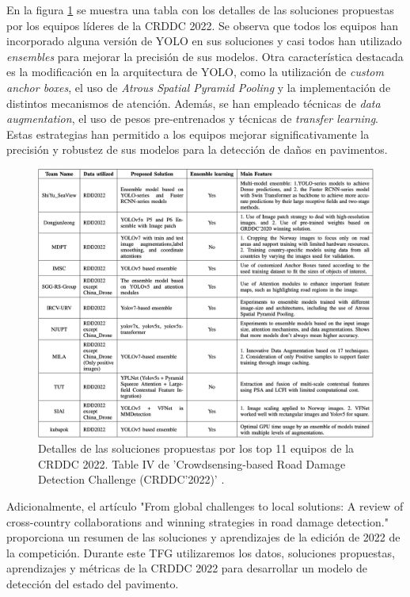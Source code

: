 En la figura \ref{fig:CRDDC2022_detailed_solutions} se muestra una tabla con los detalles de las soluciones propuestas por los equipos líderes de la CRDDC 2022. Se observa que todos los equipos han incorporado alguna versión de YOLO en sus soluciones y casi todos han utilizado \textit{ensembles} para mejorar la precisión de sus modelos. Otra característica destacada es la modificación en la arquitectura de YOLO, como la utilización de \textit{custom anchor boxes}, el uso de \textit{Atrous Spatial Pyramid Pooling} y la implementación de distintos mecanismos de atención. Además, se han empleado técnicas de \textit{data augmentation}, el uso de pesos pre-entrenados y técnicas de \textit{transfer learning}. Estas estrategias han permitido a los equipos mejorar significativamente la precisión y robustez de sus modelos para la detección de daños en pavimentos.

\begin{figure}[H]
    \centering
    \includegraphics[width=1\textwidth]{../img/winner-solutions.png}
    \caption{Detalles de las soluciones propuestas por los top 11 equipos de la CRDDC 2022. Table IV de 'Crowdsensing-based Road Damage Detection Challenge (CRDDC’2022)' \cite{CRDDC2022_paper}.}
    \label{fig:CRDDC2022_detailed_solutions}
\end{figure}

Adicionalmente, el artículo "From global challenges to local solutions: A review of cross-country collaborations and winning strategies in road damage detection." \cite{CRDDC2022_review} proporciona un resumen de las soluciones y aprendizajes de la edición de 2022 de la competición. Durante este TFG utilizaremos los datos, soluciones propuestas, aprendizajes y métricas de la CRDDC 2022 para desarrollar un modelo de detección del estado del pavimento.

